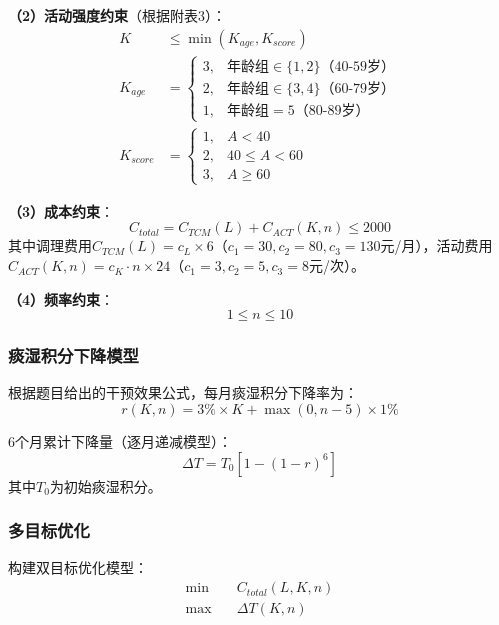 \documentclass[12pt,a4paper]{ctexart}
\begin{document}
\textbf{（2）活动强度约束}（根据附表3）：
\begin{align}
    K &\leq \min(K_{age}, K_{score}) \\
    K_{age} &= \begin{cases}
        3, & \text{年龄组} \in \{1,2\} \text{（40-59岁）} \\
        2, & \text{年龄组} \in \{3,4\} \text{（60-79岁）} \\
        1, & \text{年龄组} = 5 \text{（80-89岁）}
    \end{cases} \\
    K_{score} &= \begin{cases}
        1, & A < 40 \\
        2, & 40 \leq A < 60 \\
        3, & A \geq 60
    \end{cases}
\end{align}

\textbf{（3）成本约束}：
\begin{equation}
    C_{total} = C_{TCM}(L) + C_{ACT}(K,n) \leq 2000
\end{equation}
其中调理费用$C_{TCM}(L) = c_L \times 6$（$c_1=30, c_2=80, c_3=130$元/月），活动费用$C_{ACT}(K,n) = c_K \cdot n \times 24$（$c_1=3, c_2=5, c_3=8$元/次）。

\textbf{（4）频率约束}：
\begin{equation}
    1 \leq n \leq 10
\end{equation}

\subsubsection{痰湿积分下降模型}

根据题目给出的干预效果公式，每月痰湿积分下降率为：
\begin{equation}
    r(K,n) = 3\% \times K + \max(0, n-5) \times 1\%
\end{equation}

6个月累计下降量（逐月递减模型）：
\begin{equation}
    \Delta T = T_0 \left[1 - (1-r)^6\right]
\end{equation}
其中$T_0$为初始痰湿积分。

\subsubsection{多目标优化}

构建双目标优化模型：
\begin{align}
    \min \quad & C_{total}(L,K,n) \\
    \max \quad & \Delta T(K,n)
\end{align}
\end{document}
